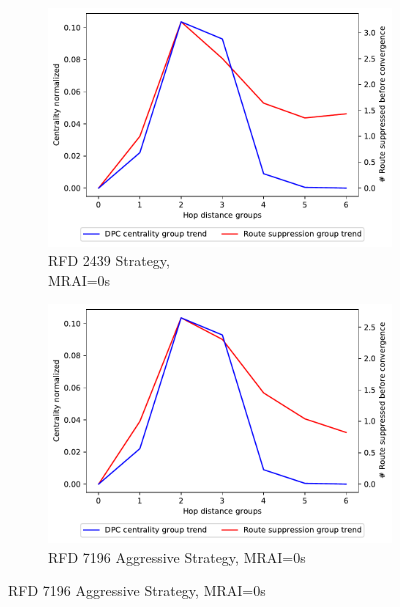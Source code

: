 \begin{figure}[H]
     \centering
     \begin{subfigure}[b]{0.325\textwidth}
         \centering
         \includegraphics[width=\textwidth]{images/RFD/miceVSelephants/MultiMRAI/0/elephants/cisco_1000_RFD_nodeConvergence_centVSsup_trend.pdf}
         \caption{RFD 2439 Strategy, \\MRAI=0s}
         \label{fig:1000_2439RFD_centVSsup_elephants}
     \end{subfigure}
     \hfill
     \begin{subfigure}[b]{0.325\textwidth}
         \centering
         \includegraphics[width=\textwidth]{images/RFD/miceVSelephants/MultiMRAI/0/elephants/cisco_1000_RFD_7196_aggressive_nodeConvergence_centVSsup_trend.pdf}
         \caption{RFD 7196 Aggressive Strategy, MRAI=0s}
         \label{fig:1000_7196RFDA_centVSsup_elephants}

\end{subfigure}
\end{figure}

